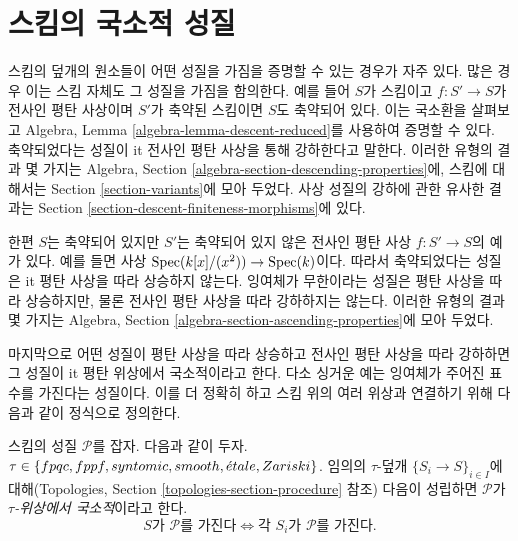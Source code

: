 \section{스킴의 국소적 성질}
\label{section-descending-properties}

\noindent
스킴의 덮개의 원소들이 어떤 성질을 가짐을 증명할 수 있는 경우가 자주 있다.
많은 경우 이는 스킴 자체도 그 성질을 가짐을 함의한다. 예를 들어 $S$가
스킴이고 $f : S' \to S$가 전사인 평탄 사상이며 $S'$가 축약된 스킴이면
$S$도 축약되어 있다. 이는 국소환을 살펴보고 Algebra, Lemma
\ref{algebra-lemma-descent-reduced}를 사용하여 증명할 수 있다. 축약되었다는
성질이 {it 전사인 평탄 사상을 통해 강하한다}고 말한다. 이러한 유형의 결과
몇 가지는 Algebra, Section \ref{algebra-section-descending-properties}에,
스킴에 대해서는 Section \ref{section-variants}에 모아 두었다. 사상 성질의
강하에 관한 유사한 결과는 Section
\ref{section-descent-finiteness-morphisms}에 있다.

\medskip\noindent
한편 $S$는 축약되어 있지만 $S'$는 축약되어 있지 않은 전사인 평탄 사상
$f : S' \to S$의 예가 있다. 예를 들면 사상
$\mathop{\mathrm{Spec}}(k[x]/(x^2)) \to \mathop{\mathrm{Spec}}(k)$이다. 따라서 축약되었다는 성질은
{it 평탄 사상을 따라 상승하지 않는다}. 잉여체가 무한이라는 성질은 평탄
사상을 따라 상승하지만, 물론 전사인 평탄 사상을 따라 강하하지는 않는다.
이러한 유형의 결과 몇 가지는 Algebra, Section
\ref{algebra-section-ascending-properties}에 모아 두었다.

\medskip\noindent
마지막으로 어떤 성질이 평탄 사상을 따라 상승하고 전사인 평탄 사상을 따라
강하하면 그 성질이 {it 평탄 위상에서 국소적}이라고 한다. 다소 싱거운 예는
잉여체가 주어진 표수를 가진다는 성질이다. 이를 더 정확히 하고 스킴 위의 여러
위상과 연결하기 위해 다음과 같이 정식으로 정의한다.

\begin{definition}
\label{definition-property-local}
스킴의 성질 $\mathcal{P}$를 잡자. 다음과 같이 두자.
$\tau \in \{fpqc, \linebreak[0] fppf, \linebreak[0] syntomic, \linebreak[0]
smooth, \linebreak[0] \etale, \linebreak[0] Zariski\}$.
임의의 $\tau$-덮개 $\{S_i \to S\}_{i \in I}$에 대해(Topologies, Section
\ref{topologies-section-procedure} 참조) 다음이 성립하면 $\mathcal{P}$가
{\it $\tau$-위상에서 국소적}이라고 한다.
$$
S \text{가 }\mathcal{P}\text{를 가진다}
\Leftrightarrow
\text{각 }S_i \text{가 }\mathcal{P}\text{를 가진다}.
$$
\end{definition}


